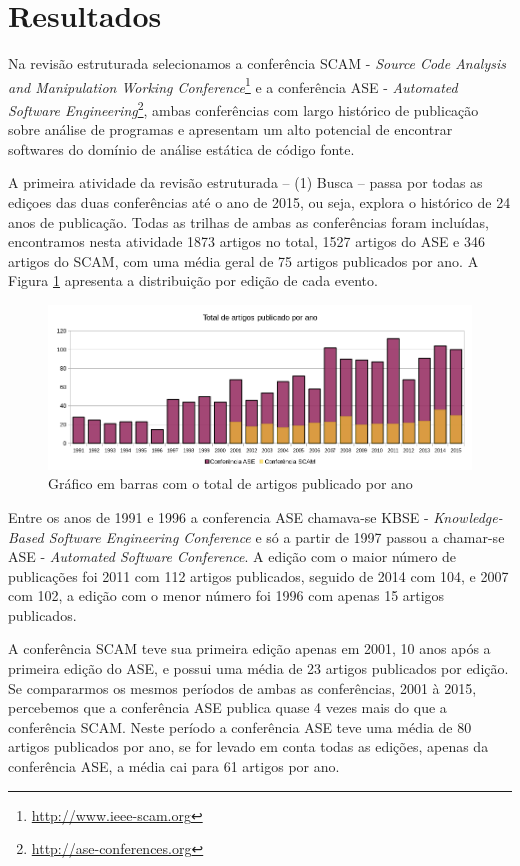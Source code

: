 \section{Resultados}

Na revisão estruturada selecionamos a conferência SCAM - {\it
Source Code Analysis and Manipulation Working
Conference}\footnote{\url{http://www.ieee-scam.org}} e a conferência ASE - {\it
Automated Software Engineering}\footnote{\url{http://ase-conferences.org}},
ambas conferências com largo histórico de publicação sobre análise de
programas e apresentam um alto potencial de encontrar softwares do domínio de
análise estática de código fonte.

A primeira atividade da revisão estruturada -- (1) Busca -- passa por
todas as ediçoes das duas conferências até o ano de 2015, ou seja, explora o
histórico de 24 anos de publicação. Todas as trilhas de ambas as conferências
foram incluídas, encontramos nesta atividade 1873 artigos no total, 1527 artigos
do ASE e 346 artigos do SCAM, com uma média geral de 75 artigos publicados por ano. A
Figura \ref{artigos-por-ano} apresenta a distribuição por edição de cada
evento.

\begin{figure}[h]
  \center
  \includegraphics[scale=0.65]{imagens/artigos-por-ano.png}
  \caption{Gráfico em barras com o total de artigos publicado por ano}
  \label{artigos-por-ano}
\end{figure}

Entre os anos de 1991 e 1996 a conferencia ASE chamava-se KBSE - {\it
Knowledge-Based Software Engineering Conference} e só a partir de 1997 passou a
chamar-se ASE - {\it Automated Software Conference}. A edição com o maior
número de publicações foi 2011 com 112 artigos publicados, seguido de 2014 com
104, e 2007 com 102, a edição com o menor número foi 1996 com apenas 15 artigos
publicados.

A conferência SCAM teve sua primeira edição apenas em 2001, 10 anos após a
primeira edição do ASE, e possui uma média de 23 artigos publicados por edição.
Se compararmos os mesmos períodos de ambas as conferências, 2001 à 2015,
percebemos que a conferência ASE publica quase 4 vezes mais do que a
conferência SCAM. Neste período a conferência ASE teve uma média de 80 artigos
publicados por ano, se for levado em conta todas as edições, apenas da
conferência ASE, a média cai para 61 artigos por ano.

